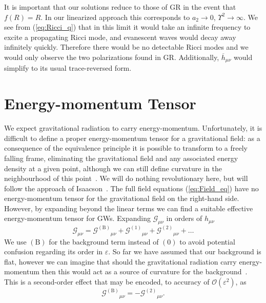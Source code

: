 \documentclass[aps,prd,amsfonts,amssymb,amsmath,nofootinbib,reprint,showpacs]{revtex4-1}
\newcommand{\eqnref}[1]{(\ref{eq:#1})}
\newcommand{\order}[1]{\ensuremath{\mathcal{O}({#1})}}
\begin{document}
It is important that our solutions reduce to those of GR in the event that $f(R) = R$. In our linearized approach this corresponds to $a_2 \rightarrow 0$, $\Upsilon^2 \rightarrow \infty$. We see from \eqnref{Ricci_q} that in this limit it would take an infinite frequency to excite a propagating Ricci mode, and evanescent waves would decay away infinitely quickly. Therefore there would be no detectable Ricci modes and we would only observe the two polarizations found in GR. Additionally, $\overline{h}_{\mu\nu}$ would simplify to its usual trace-reversed form.

\section{Energy-momentum Tensor\label{sec:EM_tensor}}

We expect gravitational radiation to carry energy-momentum. Unfortunately, it is difficult to define a proper energy-momentum tensor for a gravitational field: as a consequence of the equivalence principle it is possible to transform to a freely falling frame, eliminating the gravitational field and any associated energy density at a given point, although we can still define curvature in the neighbourhood of this point~\cite{Misner1973, Hobson2006}. We will do nothing revolutionary here, but will follow the approach of Isaacson~\cite{Isaacson1968, Isaacson1968a}. The full field equations \eqnref{Field_eq} have no energy-momentum tensor for the gravitational field on the right-hand side. However, by expanding beyond the linear terms we can find a suitable effective energy-momentum tensor for GWs. Expanding $\mathcal{G}_{\mu\nu}$ in orders of $h_{\mu\nu}$
\begin{equation}
\mathcal{G}_{\mu\nu} = {\mathcal{G}^{(\text{B})}}_{\mu\nu} + {\mathcal{G}^{(1)}}_{\mu\nu} + {\mathcal{G}^{(2)}}_{\mu\nu} + \ldots
\label{eq:G_exp}
\end{equation}
We use $(\text{B})$ for the background term instead of $(0)$ to avoid potential confusion regarding its order in $\varepsilon$. So far we have assumed that our background is flat, however we can imagine that should the gravitational radiation carry energy-momentum then this would act as a source of curvature for the background~\cite{Wald1984}. This is a second-order effect that may be encoded, to accuracy of $\order{\varepsilon^2}$, as
\begin{equation}
{\mathcal{G}^{(\text{B})}}_{\mu\nu} = -{\mathcal{G}^{(2)}}_{\mu\nu}.
\end{equation}
\end{document}

